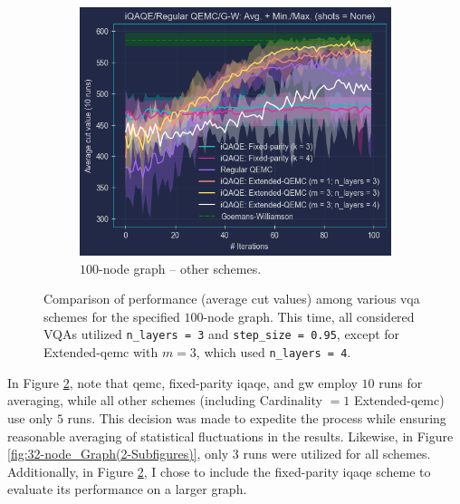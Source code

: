 \begin{figure}[hb!]
\begin{subfigure}[b]{0.495\textwidth}
        \includegraphics[width=1\textwidth]{Figures/Chapter_5/Large graphs/100-node_Graph.png}
        \caption{$100$-node graph – other schemes.}
        \label{fig:100-node_Graph}
    \end{subfigure}
    \caption{Comparison of performance (average cut values) among various \acrshort{vqa} schemes for the specified $100$-node graph. This time, all considered VQAs utilized \texttt{n\_layers = 3} and \texttt{step\_size = 0.95}, except for Extended-\acrshort{qemc} with $m=3$, which used \texttt{n\_layers = 4}.}
    \label{fig:100-node_Graph(2-Subfigures)}
\end{figure}

In Figure \ref{fig:100-node_Graph(2-Subfigures)}, note that \acrshort{qemc}, fixed-parity \acrshort{iqaqe}, and \acrshort{gw} employ $10$ runs for averaging, while all other schemes (including Cardinality $= 1$ Extended-\acrshort{qemc}) use only $5$ runs. This decision was made to expedite the process while ensuring reasonable averaging of statistical fluctuations in the results. Likewise, in Figure \ref{fig:32-node_Graph(2-Subfigures)}, only $3$ runs were utilized for all schemes. Additionally, in Figure \ref{fig:100-node_Graph(2-Subfigures)}, I chose to include the fixed-parity \acrshort{iqaqe} scheme to evaluate its performance on a larger graph.

